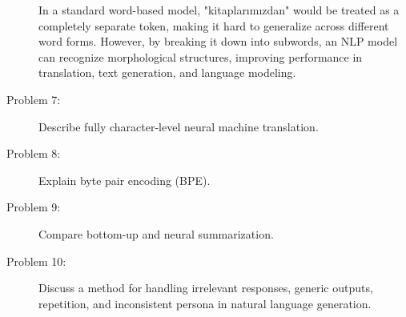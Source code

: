\documentclass[10pt]{article}
\begin{document}
\begin{description}
In a standard word-based model, "kitaplarımızdan" would be treated as a completely separate token, making it hard to generalize across different word forms. 
However, by breaking it down into subwords, an NLP model can recognize morphological structures, improving performance in translation, text generation, and language modeling.

\pagebreak

\item[Problem 7:]  Describe fully character-level neural machine translation.

\pagebreak

\item[Problem 8:]  Explain byte pair encoding (BPE).

\pagebreak

\item[Problem 9:]  Compare bottom-up and neural summarization.

\pagebreak


\item[Problem 10:]  Discuss a method for handling irrelevant responses, generic outputs, repetition, and inconsistent persona in natural language generation.


\end{description}
\end{document}
